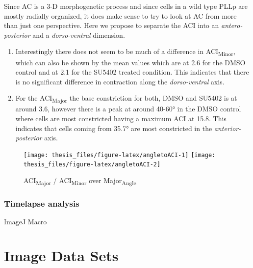 \documentclass[11pt,singlespacinge,twoside]{reedthesis} %
\begin{document}
\noindent Since AC is a 3-D morphogenetic process and since cells in a wild type PLLp are mostly radially organized, it does make sense to try to look at AC from more than just one perspective. Here we propose to separate the ACI into an \emph{antero-posterior} and a \emph{dorso-ventral} dimension.
\begin{enumerate}
\def\labelenumi{\arabic{enumi}.}
\item
  Interestingly there does not seem to be much of a difference in ACI\textsubscript{Minor}, which can also be shown by the mean values which are at 2.6 for the DMSO control and at 2.1 for the SU5402 treated condition. This indicates that there is no significant difference in contraction along the \emph{dorso-ventral} axis.
\item
  For the ACI\textsubscript{Major} the base constriction for both, DMSO and SU5402 is at around 3.6, however there is a peak at around 40-60° in the DMSO control where cells are most constricted having a maximum ACI at 15.8. This indicates that cells coming from 35.7° are most constricted in the \emph{anterior-posterior} axis.
\end{enumerate}

\begin{figure}

{\centering \texttt{[image: thesis\_files/figure-latex/angletoACI-1]} \texttt{[image: thesis\_files/figure-latex/angletoACI-2]} 

}

\caption{ACI\textsubscript{Major} / ACI\textsubscript{Minor} over Major\textsubscript{Angle}}\label{fig:angletoACI}
\end{figure}
\hypertarget{timelapse-analysis}{%
\subsubsection{Timelapse analysis}\label{timelapse-analysis}}

ImageJ Macro

\hypertarget{mat-datasets}{%
\section{Image Data Sets}\label{mat-datasets}}
\end{document}
